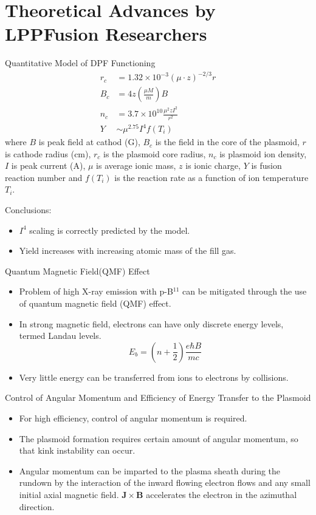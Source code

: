 \section{Theoretical Advances by LPPFusion Researchers}
\begin{frame} {Quantitative Model of DPF Functioning}
    \begin{align}
        r_c & = 1.32\times10^{-3}(\mu\cdot z)^{-2/3}r \\
        B_c & = 4z\left(\frac{\mu M}{m}\right)B       \\
        n_c & = 3.7\times10^{10}\frac{\mu^2zI^2}{r^2} \\
        Y   & \sim \mu^{2.75}I^4f(T_i)
    \end{align}
    where $B$ is peak field at cathod (G), $B_c$ is the field in the core of the plasmoid, $r$ is cathode radius (cm), $r_c$ is the plasmoid core radius, $n_c$ is plasmoid ion density, $I$ is peak current (A), $\mu$ is average ionic mass, $z$ is ionic charge, $Y$ is fusion reaction number and $f(T_i)$ is the reaction rate as a function of ion temperature $T_i$.

    Conclusions:
    \begin{itemize}
        \item $I^4$ scaling is correctly predicted by the model.
        \item Yield increases with increasing atomic mass of the fill gas.
    \end{itemize}
\end{frame}

\begin{frame} {Quantum Magnetic Field(QMF) Effect}
    \begin{itemize}
        \item Problem of high X-ray emission with p-B$^{11}$ can be mitigated through the use of quantum magnetic field (QMF) effect.
        \item In strong magnetic field, electrons can have only discrete energy levels, termed Landau levels.
              \[ E_b = \left(n + \frac{1}{2}\right)\frac{e\hbar B}{mc} \]
        \item Very little energy can be transferred from ions to electrons by collisions.
    \end{itemize}
\end{frame}

\begin{frame} {Control of Angular Momentum and Efficiency of Energy Transfer to the Plasmoid}
    \begin{itemize}
        \item For high efficiency, control of angular momentum is required.
        \item The plasmoid formation requires certain amount of angular momentum, so that kink instability can occur.
        \item Angular momentum can be imparted to the plasma sheath during the rundown by the interaction of the inward flowing electron flows and any small initial axial magnetic field. $\mathbf{J\times B}$ accelerates the electron in the azimuthal direction.
    \end{itemize}
\end{frame}

